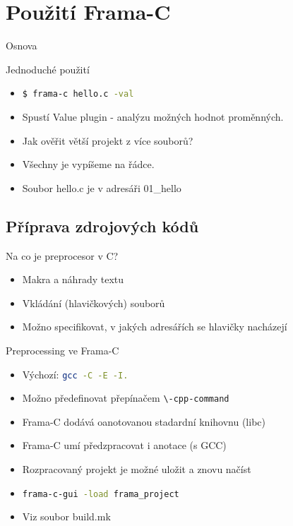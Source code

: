 \documentclass[11pt]{beamer}
\begin{document}
\section{Použití Frama-C}
\begin{frame}{Osnova}
\end{frame}

\begin{frame}{Jednoduché použití}
\begin{itemize}
	\item \lstinline[language=bash]{$ frama-c hello.c -val}
	\pause \item Spustí Value plugin - analýzu možných hodnot proměnných.
	\pause \item Jak ověřit větší projekt z více souborů?
	\pause \item Všechny je vypíšeme na řádce.
	\pause \item Soubor hello.c je v adresáři 01\_hello
\end{itemize}
\end{frame}


\subsection{Příprava zdrojových kódů}

\begin{frame}{Na co je preprocesor v C?}
\begin{itemize}
	\pause \item Makra a náhrady textu
	\pause \item Vkládání (hlavičkových) souborů
	\pause \item Možno specifikovat, v jakých adresářích se hlavičky nacházejí
\end{itemize}
\end{frame}

\begin{frame}{Preprocessing ve Frama-C}
\begin{itemize}
	\item Výchozí: \lstinline[language=bash]{gcc -C -E -I.}
	\item Možno předefinovat přepínačem \lstinline[language=bash]{\-cpp-command}
	\pause \item Frama-C dodává oanotovanou stadardní knihovnu (libc)
	\pause \item Frama-C umí předzpracovat i anotace (s GCC)
	\pause \item Rozpracovaný projekt je možné uložit a znovu načíst
	\pause \item \lstinline[language=bash]{frama-c-gui -load frama_project}
	\pause \item Viz soubor build.mk
\end{itemize}
\end{frame}
\end{document}
